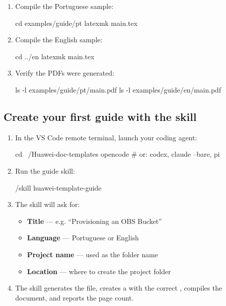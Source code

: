 \documentclass{guide}
\begin{document}
\stepbystep
\begin{enumerate}
  \item Compile the Portuguese sample:

  \begin{code}[bash]
cd examples/guide/pt
latexmk main.tex
  \end{code}

  \item Compile the English sample:

  \begin{code}[bash]
cd ../en
latexmk main.tex
  \end{code}

  \item Verify the PDFs were generated:

  \begin{code}[bash]
ls -l examples/guide/pt/main.pdf
ls -l examples/guide/en/main.pdf
  \end{code}
\end{enumerate}

\subsection{Create your first guide with the skill}

\stepbystep
\begin{enumerate}
  \item In the VS Code remote terminal, launch your coding agent:

  \begin{code}[bash]
cd ~/Huawei-doc-templates
opencode          # or: codex, claude --bare, pi
  \end{code}

  \item Run the guide skill:

  \begin{code}
/skill huawei-template-guide
  \end{code}

  \item The skill will ask for:
    \begin{itemize}
      \item \textbf{Title} — e.g. ``Provisioning an OBS Bucket''
      \item \textbf{Language} — Portuguese or English
      \item \textbf{Project name} — used as the folder name
      \item \textbf{Location} — where to create the project folder
    \end{itemize}

  \item The skill generates the  file, creates a
         with the correct , compiles the
        document, and reports the page count.

\end{enumerate}
\end{document}
